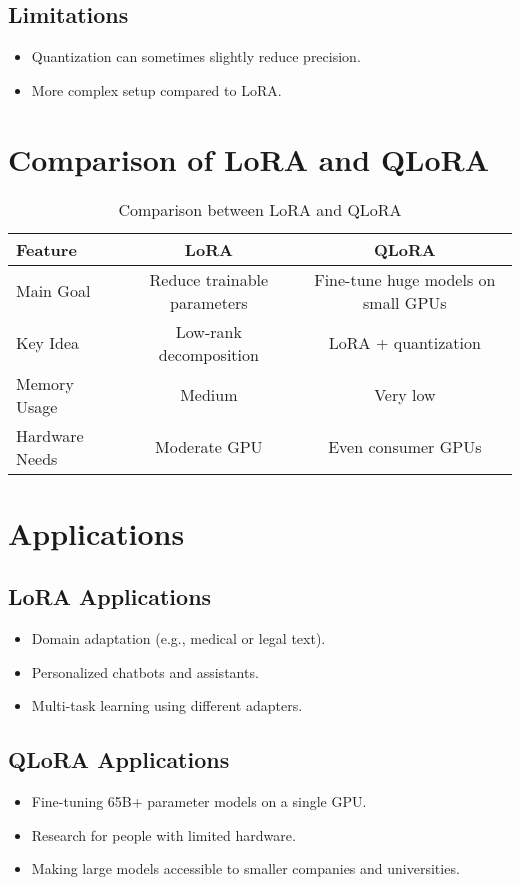 \documentclass[11pt]{article}
\begin{document}
\subsection{Limitations}
\begin{itemize}
    \item Quantization can sometimes slightly reduce precision.
    \item More complex setup compared to LoRA.
\end{itemize}

\section{Comparison of LoRA and QLoRA}
\begin{table}[h]
\centering
\begin{tabular}{lcc}
\toprule
\textbf{Feature} & \textbf{LoRA} & \textbf{QLoRA} \\
\midrule
Main Goal & Reduce trainable parameters & Fine-tune huge models on small GPUs \\
Key Idea & Low-rank decomposition & LoRA + quantization \\
Memory Usage & Medium & Very low \\
Hardware Needs & Moderate GPU & Even consumer GPUs \\
\bottomrule
\end{tabular}
\caption{Comparison between LoRA and QLoRA}
\end{table}

\section{Applications}
\subsection{LoRA Applications}
\begin{itemize}
    \item Domain adaptation (e.g., medical or legal text).
    \item Personalized chatbots and assistants.
    \item Multi-task learning using different adapters.
\end{itemize}

\subsection{QLoRA Applications}
\begin{itemize}
    \item Fine-tuning 65B+ parameter models on a single GPU.
    \item Research for people with limited hardware.
    \item Making large models accessible to smaller companies and universities.
\end{itemize}
\end{document}
